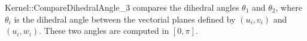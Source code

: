 \begin{ccRefFunctionObjectConcept}{Kernel::CompareDihedralAngle_3}
      {compares the dihedral angles $\theta_1$ and $\theta_2$, where
        $\theta_i$ is the dihedral angle between the vectorial planes
        defined by $(u_i, v_i)$ and $(u_i, w_i)$. These two angles are
        computed in $[0, \pi]$.
        }

\end{ccRefFunctionObjectConcept}
